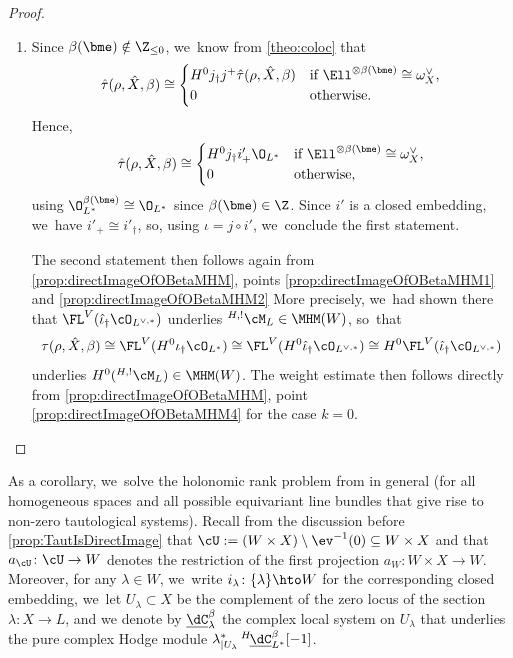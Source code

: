 \begin{proof}
\begin{enumerate}
\item Since $\beta(\bme) \notin \Z_{\leq 0}$, we~know from \cref{theo:coloc} that
\[
\hat\tau(\rho, \hat X, \beta) \cong 
\begin{cases} H^0 j_\dag j^+ \hat\tau(\rho, \hat X, \beta) &\text{if } \Ell^{\otimes \beta(\bme)} \cong \omega_X^\vee, \\
0 & \text{otherwise.}
\end{cases}
\]
Hence,
\[
\hat\tau(\rho, \hat X, \beta) \cong 
\begin{cases} H^0 j_\dag i'_+ \O_{L^*} &\text{if } \Ell^{\otimes \beta(\bme)} \cong \omega_X^\vee, \\
0 & \text{otherwise,}
\end{cases}
\]
using $\O_{L^*}^{\beta(\bme)} \cong \O_{L^*}$ since $\beta(\bme) \in \Z$. Since $i'$ is a closed embedding, we~have $i'_+ \cong i'_\dag$, so, using $\iota = j \circ i'$, we~conclude the first statement.

The second statement then follows again from \cref{prop:directImageOfOBetaMHM}, points \eqref{prop:directImageOfOBetaMHM1} and \eqref{prop:directImageOfOBetaMHM2} More precisely, we~had shown there that $\FL^V(\hat{\iota}_\dag \cO_{L^{\vee,*}})$ underlies ${^{H,!}}\cM_L\in\MHM(W)$, so~that
\[
\tau(\rho,\hat{X},\beta)
\cong
\FL^V(H^0 \iota_\dag \cO_{L^*})
\cong
\FL^V(H^0 \hat{\iota}_\dag \cO_{L^{\vee,*}})
\cong
H^0\FL^V(\hat{\iota}_\dag \cO_{L^{\vee,*}})
\]
underlies $H^0({^{H,!}}\cM_L)\in\MHM(W)$. The weight estimate then follows directly from \cref{prop:directImageOfOBetaMHM}, point \eqref{prop:directImageOfOBetaMHM4} for the case $k=0$. \qedhere
\end{enumerate}
\end{proof}

As a corollary, we~solve the holonomic rank problem from \cite[Conj.\,1.3.]{Bloch_HolRankProb} in general (\ie for all homogeneous spaces and all possible equivariant line bundles that give rise to non-zero tautological systems). Recall from the discussion before \cref{prop:TautIsDirectImage} that $\cU:=(W\times X) \setminus \ev^{-1}(0) \subseteq W\times X$ and that $a_\cU\colon \cU\to W$ denotes the restriction of the first projection $a_W \colon W\times X\to W$.
Moreover, for any $\lambda\in W$, we~write $i_\lambda \colon \{\lambda\}\hto W$ for the corresponding closed embedding, we~let $U_\lambda\subset X$ be the complement of the zero locus of the section $\lambda \colon X\to L$, and we denote by $\underline{\dC}^\beta_\lambda$ the complex local system on $U_\lambda$ that underlies the pure complex Hodge module $\lambda^*_{|U_\lambda}\, ^{H\!}\underline{\dC}^\beta_{L^*}[-1]$.

